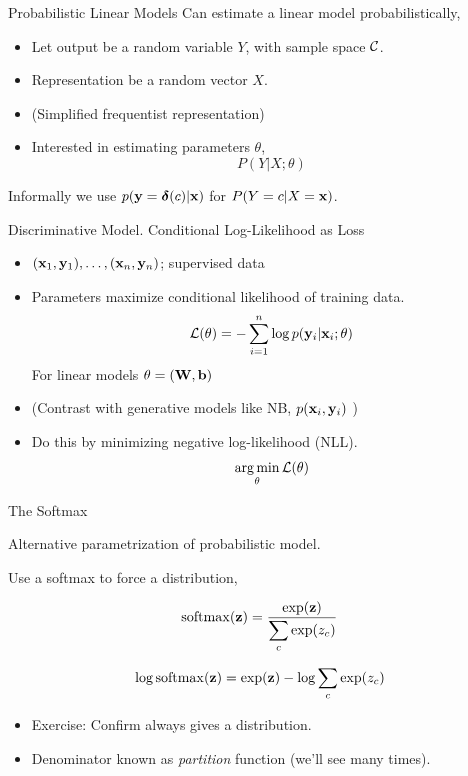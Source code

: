 \documentclass{beamer}
\begin{document}
\begin{frame}{Probabilistic Linear Models} 
  Can estimate a linear model probabilistically,

  \begin{itemize}
  \item Let output be a random variable $Y$, with sample space $\mathcal{C}$. 
  \item Representation be a random vector $X$. 
  \item (Simplified frequentist representation)
  \item Interested in estimating parameters $\theta$,
      \[ P(Y | X; \theta) \] 
  \end{itemize}
  Informally we use $p(\mathbf{y}=\boldsymbol{\delta}(c) | \mathbf{x})$ for 
  $P(Y = c | X = \mathbf{x})$.
  
\end{frame}



\begin{frame}{Discriminative Model. Conditional Log-Likelihood as Loss } 
  \begin{itemize}
  \item $(\mathbf{x}_1, \mathbf{y}_1), \ldots, (\mathbf{x}_n, \mathbf{y}_n)$; supervised data
  \item Parameters maximize conditional likelihood of training data.
    \[ \mathcal{L}(\theta) =  - \sum_{i=1}^n \log p(\mathbf{y}_i | \mathbf{x}_i ; \theta) \] 
  For linear models $\theta = (\mathbf{W}, \mathbf{b})$ 
   \item (Contrast with generative models like NB, $p(\mathbf{x}_i, \mathbf{y}_i)$ )
  \item Do this by minimizing negative log-likelihood (NLL).
    \[ \argmin_\theta \mathcal{L}(\theta)\] 
  \end{itemize}
\end{frame}


\begin{frame}{The Softmax}

  Alternative parametrization of probabilistic model.

  
  Use a softmax to force a distribution,
  
  \[\softmax(\boldz) = \frac{\exp(\boldz)}{\displaystyle \sum_{c } \exp(z_c)}  \]

  \[\log \softmax(\boldz) = \exp(\boldz) - \log \sum_{c} \exp(z_c)  \]


  \begin{itemize}
  \item Exercise: Confirm always gives a distribution.

  \item Denominator known as \textit{partition} function (we'll see many times).
  \end{itemize}

\end{frame}
\end{document}
